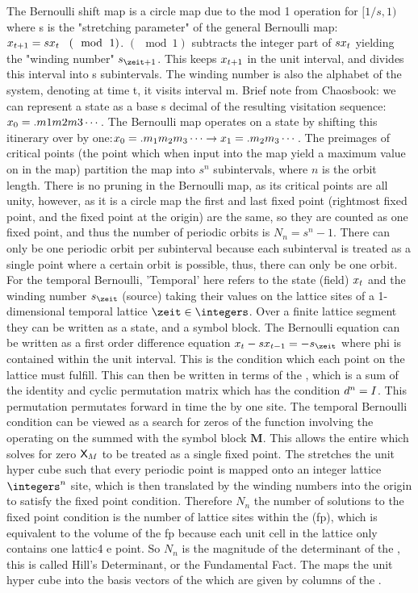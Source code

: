 \begin{description}
The Bernoulli shift map is a circle map due to the mod 1
operation for $[1/s,1)$ where s is the "stretching parameter" of the
general Bernoulli map: $x_{t+1}=sx_t \hspace{3mm} (\mod
\hspace{1mm}1)$. $(\mod 1)$ subtracts the integer part of $sx_t$ yielding
the "winding number" $\Ssym{\zeit+1}$. This keeps $x_{t+1}$ in the unit
interval, and divides this interval into s subintervals. The winding
number is also the alphabet of the system, denoting at time t, it visits
interval m. Brief note from Chaosbook: we can represent a state as a base
s decimal of the resulting visitation sequence: $x_0=.m1m2m3\cdots$.
The Bernoulli map operates on a state by shifting this itinerary over by
one:$x_0=.m_1m_2m_3\cdots\rightarrow x_1=.m_2m_3\cdots$. The
preimages of critical points (the point which when input into the map
yield a maximum value on in the map) partition the map into $s^n$
subintervals, where $n$ is the orbit length. There is no pruning in the
Bernoulli map, as its critical points are all unity, however, as it is a
circle map the first and last fixed point (rightmost fixed point, and the
fixed point at the origin) are the same, so they are counted as one fixed
point, and thus the number of periodic orbits is $N_n=s^n-1$. There can
only be one periodic orbit per subinterval because each subinterval is
treated as a single point where a certain orbit is possible, thus, there
can only be one orbit. For the temporal Bernoulli, 'Temporal' here refers
to the state (field) $x_t$ and the winding number $\Ssym{\zeit}$ (source)
taking their values on the lattice sites of a 1-dimensional temporal
lattice $\zeit\in\integers$. Over a finite lattice segment they can be
written as a state, and a symbol block. The Bernoulli equation can be
written as a first order difference equation $\ssp_t-s\ssp_{t-1}=-\Ssym{\zeit}$
where phi is contained within the unit interval. This is the condition
which each point on the lattice must fulfill. This can then be written in
terms of the {\jacobianOrb}, which is a sum of the identity
and cyclic permutation matrix which has the condition $d^{n}=I$.
This permutation permutates forward in time the {\lattstate} by one
site. The temporal Bernoulli condition can be viewed as a search for
zeros of the function involving the {\jacobianOrb} operating on the
{\lattstate} summed with the symbol block $\mathbf{M}$. This allows the
entire {\lattstate} which solves for zero $\mathsf{X}_M$ to be treated as a
single fixed point. The {\jacobianOrb} stretches the unit hyper cube such
that every periodic point is mapped onto an integer lattice $\integers^n$
site, which is then translated by the winding numbers into the origin to
satisfy the fixed point condition. Therefore $N_n$ the number of
solutions to the fixed point condition is the number of lattice sites
within the {\fundPip} (fp), which is equivalent to the
volume of the fp because each unit cell in the lattice only contains one
lattic4 e point. So $N_n$ is the magnitude of the determinant of the
{\jacobianOrb}, this is called Hill's Determinant, or the Fundamental
Fact. The {\jacobianOrb} maps the unit hyper cube into the basis vectors
of the {\fundPip} which are given by columns of the {\jacobianOrb}.



\end{description}
